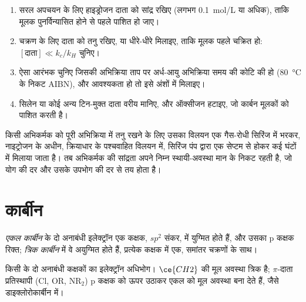 \begin{method}[मूलक अपचयन या चक्रण की अभिकल्पना]\label{met:b3:radicals-carbenes:radical-chain}
\begin{enumerate}
  \item सरल अपचयन के लिए हाइड्रोजन दाता को सांद्र रखिए (लगभग
        \qty{0.1}{mol/L} या अधिक), ताकि मूलक पुनर्विन्यासित होने से पहले पाशित हो जाए।
  \item चक्रण के लिए दाता को तनु रखिए, या धीरे-धीरे मिलाइए, ताकि
        मूलक पहले चक्रित हो: $[\text{दाता}] \ll k_c/k_H$ चुनिए।
  \item ऐसा आरंभक चुनिए जिसकी अभिक्रिया ताप पर अर्ध-आयु अभिक्रिया समय की
        कोटि की हो (\qty{80}{\celsius} के निकट AIBN), और आवश्यकता हो तो इसे अंशों में
        मिलाइए।
  \item सिलेन या कोई अन्य टिन-मुक्त दाता वरीय मानिए, और ऑक्सीजन हटाइए, जो
        कार्बन मूलकों को पाशित करती है।
\end{enumerate}
\end{method}

\begin{inthelab}[सिरिंज पंप से धीमा योग]
किसी अभिकर्मक को पूरी अभिक्रिया में तनु रखने के लिए उसका विलयन एक
गैस-रोधी सिरिंज में भरकर, नाइट्रोजन के अधीन, क्रियाधार के पश्चवाहित विलयन में,
सिरिंज पंप द्वारा एक सेप्टम से होकर कई
घंटों में मिलाया जाता है। तब अभिकर्मक की सांद्रता अपने निम्न स्थायी-अवस्था मान के निकट रहती है, जो
योग की दर और उसके उपभोग की दर से तय होता है।
\end{inthelab}

\section{कार्बीन}

\begin{definition}[एकल और त्रिक कार्बीन]\label{def:b3:radicals-carbenes:carbene-states}
\emph{एकल कार्बीन} के दो अनाबंधी
इलेक्ट्रॉन एक कक्षक, $sp^2$ संकर, में युग्मित होते हैं, और उसका p कक्षक रिक्त; \emph{त्रिक
कार्बीन} में वे अयुग्मित होते हैं, प्रत्येक कक्षक में एक,
समांतर चक्रणों के साथ।
\end{definition}

\begin{omfigure}

{\small किसी  के दो अनाबंधी कक्षकों का इलेक्ट्रॉन अधिभोग।
$\ce{CH2}$ की मूल अवस्था त्रिक है; $\pi$-दाता प्रतिस्थापी (Cl, OR, $\mathrm{NR_2}$)
p कक्षक को ऊपर उठाकर एकल को मूल अवस्था बना देते हैं, जैसे डाइक्लोरोकार्बीन में।}
\end{omfigure}

